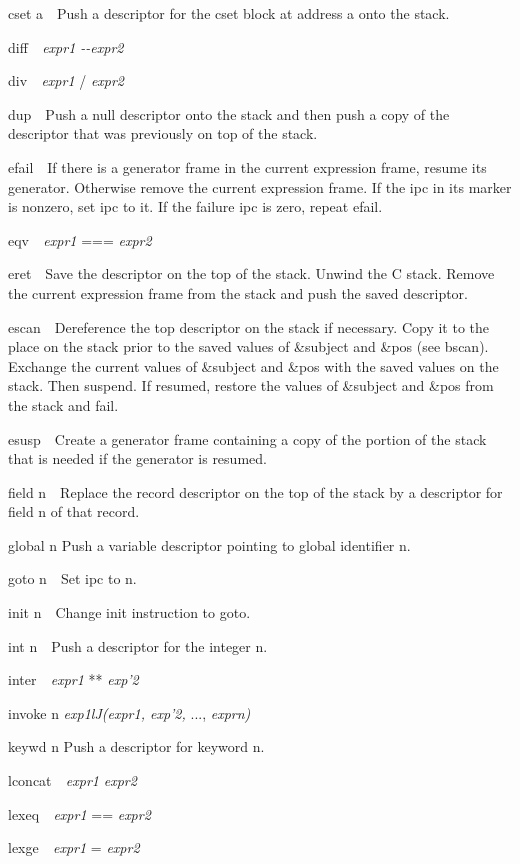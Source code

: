 cset a\ \ Push a descriptor for the cset block at address a onto the stack.


diff\textit{\ \ expr1 -{}-expr2}


div\textit{\ \ expr1 }/ \textit{expr2}


dup\ \ Push a null descriptor onto the stack and then push a copy of
the descriptor that was previously on top of the stack.


efail\ \ If there is a generator frame in the current expression
frame, resume its generator. Otherwise remove the current expression
frame. If the ipc in its marker is nonzero, set ipc to it. If the
failure ipc is zero, repeat efail.


eqv\textit{\ \ expr1 }=== \textit{expr2}


eret\ \ Save the descriptor on the top of the stack. Unwind the C
stack. Remove the current expression frame from the stack and push the
saved descriptor.


escan\ \ Dereference the top descriptor on the stack if
necessary. Copy it to the place on the stack prior to the saved values
of \&subject and \&pos (see bscan). Exchange the current values of
\&subject and \&pos with the saved values on the stack. Then
suspend. If resumed, restore the values of \&subject and \&pos from
the stack and fail.


esusp\ \ Create a generator frame containing a copy of the portion of
the stack that is needed if the generator is resumed.


field n\ \ Replace the record descriptor on the top of the stack by a
descriptor for field n of that record.


global n Push a variable descriptor pointing to global identifier n.


goto n\ \ Set ipc to n.


init n\ \ Change init instruction to goto.


int n\ \ Push a descriptor for the integer n.


inter\textit{\ \ expr1 }** \textit{exp'2}


invoke n \textit{exp1lJ(expr1, exp'2, }..., \textit{exprn)}


keywd n Push a descriptor for keyword n.


lconcat\textit{\ \ expr1 {\textbar}{\textbar}{\textbar}} \textit{expr2}


lexeq\textit{\ \ expr1 }== \textit{expr2}


lexge\textit{\ \ expr1 }{\guillemotright}= \textit{expr2}


